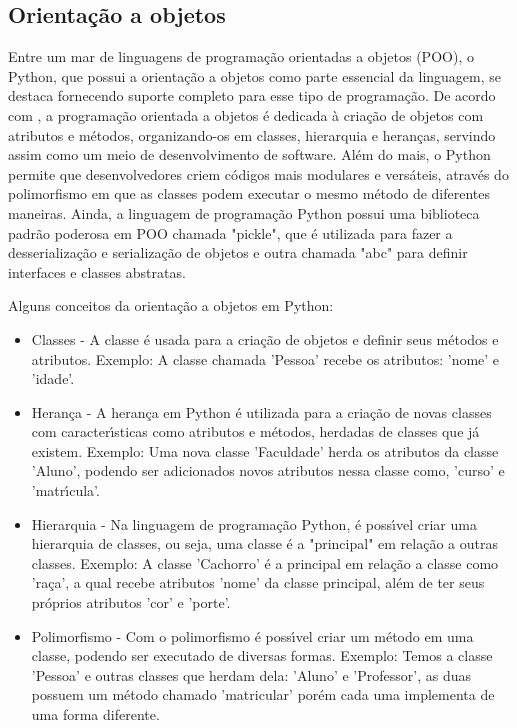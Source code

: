 	\subsection{Orientação a objetos}
Entre um mar de linguagens de programa\c{c}\~{a}o orientadas a objetos (POO), o Python, que possui a orienta\c{c}\~{a}o a objetos como parte essencial da linguagem, se destaca fornecendo suporte completo para esse tipo de programa\c{c}\~{a}o. De acordo com \cite{Feltrin2019, Feltrin2020}, a programa\c{c}\~{a}o orientada a objetos \'{e} dedicada \`{a} cria\c{c}\~{a}o de objetos com atributos e m\'{e}todos, organizando-os em classes, hierarquia e heran\c{c}as, servindo assim como um meio de desenvolvimento de software. Al\'{e}m do mais, o Python permite que desenvolvedores criem c\'{o}digos mais modulares e vers\'{a}teis, atrav\'{e}s do polimorfismo em que as classes podem executar o mesmo m\'{e}todo de diferentes maneiras. Ainda, a linguagem de programa\c{c}\~{a}o Python possui uma biblioteca padr\~{a}o poderosa em POO chamada "pickle", que \'{e} utilizada para fazer a desserializa\c{c}\~{a}o e serializa\c{c}\~{a}o de objetos e outra chamada "abc" para definir interfaces e classes abstratas.

Alguns conceitos da orienta\c{c}\~{a}o a objetos em Python:

\begin{itemize} [itemsep=5pt, parsep=5pt]

\item Classes - A classe \'{e} usada para a cria\c{c}\~{a}o de objetos e definir seus m\'{e}todos e atributos.
\subitem Exemplo: A classe chamada 'Pessoa' recebe os atributos: 'nome' e 'idade'.

\item Heran\c{c}a - A heran\c{c}a em Python \'{e} utilizada para a cria\c{c}\~{a}o de novas classes com caracter\'{\i}sticas como atributos e m\'{e}todos, herdadas de classes que j\'{a} existem.
\subitem Exemplo: Uma nova classe 'Faculdade' herda os atributos da classe 'Aluno', podendo ser adicionados novos atributos nessa classe como, 'curso' e 'matr\'{\i}cula'.

\item Hierarquia - Na linguagem de programa\c{c}\~{a}o Python, \'{e} poss\'{\i}vel criar uma hierarquia de classes, ou seja, uma classe \'{e} a "principal" em rela\c{c}\~{a}o a outras classes.
\subitem Exemplo: A classe 'Cachorro' \'{e} a principal em rela\c{c}\~{a}o a classe como 'ra\c{c}a', a qual recebe atributos 'nome' da classe principal, al\'{e}m de ter seus pr\'{o}prios atributos 'cor' e 'porte'.

\item Polimorfismo - Com o polimorfismo \'{e} poss\'{\i}vel criar um m\'{e}todo em uma classe, podendo ser executado de diversas formas.
\subitem Exemplo: Temos a classe 'Pessoa' e outras classes que herdam dela: 'Aluno' e 'Professor', as duas possuem um m\'{e}todo chamado 'matricular' por\'{e}m cada uma implementa de uma forma diferente. \newline

\end{itemize}

